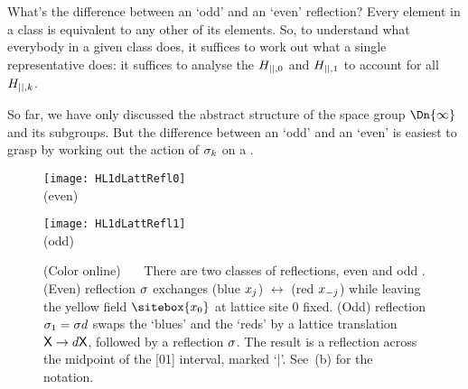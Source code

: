 What's the difference between an `odd' and an `even' reflection?
Every {element} in a class is equivalent to
any other of its {element}s.
So, to understand what everybody in a given class does, it suffices to
work out what a single representative does:
it suffices to analyse the $H_{{||},0}$ and $H_{{||},1}$
to account for all $H_{{||},k}$.

So far,
we have only discussed the abstract structure of the space group
$\Dn{\infty}$  and its subgroups. But the difference between an `odd' and
an `even' is easiest to grasp by working out the action of $\sigma_k$ on a
{\lattstate}.

\begin{figure} \begin{center}
  \begin{minipage}[b]{0.40\textwidth}\begin{center}
\texttt{[image: HL1dLattRefl0]}
  \\ (even)
  \end{center}\end{minipage}
\qquad
  \begin{minipage}[b]{0.40\textwidth}\begin{center}
\texttt{[image: HL1dLattRefl1]}
  \\ (odd)
  \end{center} \end{minipage}
  \end{center}
  \caption{\label{fig:HL1dLattRefl}
(Color online)~~~
There are two classes %
of {\lattstate} reflections,
even  and odd .
    (Even)
reflection $\sigma$ exchanges (blue
$x_j$) $\leftrightarrow$  (red $x_{-j}$) %
while leaving the yellow
field $\sitebox{\ssp_0}$ at lattice site ${0}$ fixed.
    (Odd)
reflection $\sigma_1=\sigma d$ swaps the
`blues' and the `reds' by a lattice
translation $\mathsf{X}\to d\mathsf{X}$, followed by a reflection $\sigma$. The
result is a reflection across the midpoint of the [01] interval,  marked
`|'.
See \,(b) for the notation.
}
\end{figure}


